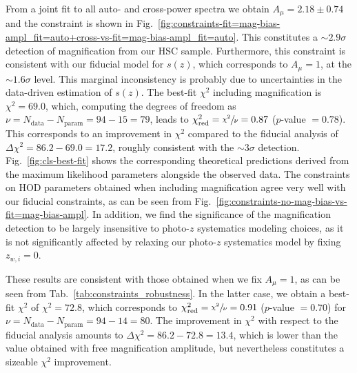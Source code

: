 \documentclass[a4paper,11pt]{article}
\begin{document}
    From a joint fit to all auto- and cross-power spectra we obtain $A_{\mu} = 2.18 \pm 0.74$ and the constraint is shown in Fig.~\ref{fig:constraints-fit=mag-bias-ampl_fit=auto+cross-vs-fit=mag-bias-ampl_fit=auto}. This constitutes a $\sim 2.9 \sigma$ detection of magnification from our HSC sample. Furthermore, this constraint is consistent with our fiducial model for $s(z)$, which corresponds to $A_{\mu} = 1$, at the $\sim 1.6 \sigma$ level. This marginal inconsistency is probably due to uncertainties in the data-driven estimation of $s(z)$. The best-fit $\chi^{2}$ including magnification is $\chi^{2} = 69.0$, which, computing the degrees of freedom as $\nu = N_{\mathrm{data}} - N_{\mathrm{param}} = 94 - 15 = 79$, leads to $\chi^{2}_{\mathrm{red}} = \sfrac{\chi^{2}}{\nu} = 0.87$ ($p$-value $= 0.78$). This corresponds to an improvement in $\chi^{2}$ compared to the fiducial analysis of $\Delta \chi^{2} = 86.2 - 69.0 = 17.2$, roughly consistent with the $\sim 3 \sigma$ detection. Fig.~\ref{fig:cls-best-fit} shows the corresponding theoretical predictions derived from the maximum likelihood parameters alongside the observed data. The constraints on HOD parameters obtained when including magnification agree very well with our fiducial constraints, as can be seen from Fig.~\ref{fig:constraints-no-mag-bias-vs-fit=mag-bias-ampl}. In addition, we find the significance of the magnification detection to be largely insensitive to photo-$z$ systematics modeling choices, as it is not significantly affected by relaxing our photo-$z$ systematics model by fixing $z_{w, i} = 0$. 

    These results are consistent with those obtained when we fix $A_{\mu} = 1$, as can be seen from Tab.~\ref{tab:constraints_robustness}. In the latter case, we obtain a best-fit $\chi^{2}$ of $\chi^{2} = 72.8$, which corresponds to $\chi^{2}_{\mathrm{red}} = \sfrac{\chi^{2}}{\nu} = 0.91$ ($p$-value $= 0.70$) for $\nu = N_{\mathrm{data}} - N_{\mathrm{param}} = 94 - 14 = 80$. The improvement in $\chi^{2}$ with respect to the fiducial analysis amounts to $\Delta \chi^{2} = 86.2 - 72.8 = 13.4$, which is lower than the value obtained with free magnification amplitude, but nevertheless constitutes a sizeable $\chi^{2}$ improvement.
\end{document}
